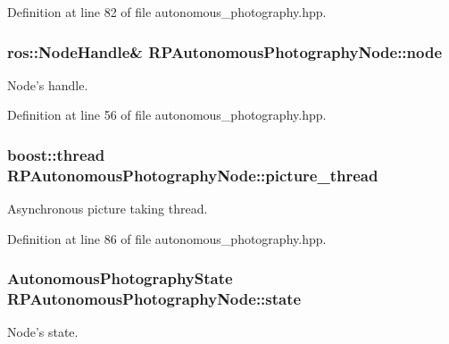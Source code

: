 \-Definition at line 82 of file autonomous\-\_\-photography.\-hpp.

\hypertarget{class_r_p_autonomous_photography_node_a76b5869d4c60b361445d78995569a0fa}{
\subsubsection[{node}]{\setlength{\rightskip}{0pt plus 5cm}ros\-::\-Node\-Handle\& {\bf \-R\-P\-Autonomous\-Photography\-Node\-::node}}}\label{class_r_p_autonomous_photography_node_a76b5869d4c60b361445d78995569a0fa}
\-Node's handle. 

\-Definition at line 56 of file autonomous\-\_\-photography.\-hpp.

\hypertarget{class_r_p_autonomous_photography_node_a21212629a7d966ca325c5ac6fad47c0e}{
\subsubsection[{picture\-\_\-thread}]{\setlength{\rightskip}{0pt plus 5cm}boost\-::thread {\bf \-R\-P\-Autonomous\-Photography\-Node\-::picture\-\_\-thread}}}\label{class_r_p_autonomous_photography_node_a21212629a7d966ca325c5ac6fad47c0e}
\-Asynchronous picture taking thread. 

\-Definition at line 86 of file autonomous\-\_\-photography.\-hpp.

\hypertarget{class_r_p_autonomous_photography_node_ac089c5ccbee966592436a2975b8a2403}{
\subsubsection[{state}]{\setlength{\rightskip}{0pt plus 5cm}\-Autonomous\-Photography\-State {\bf \-R\-P\-Autonomous\-Photography\-Node\-::state}}}\label{class_r_p_autonomous_photography_node_ac089c5ccbee966592436a2975b8a2403}
\-Node's state. 

